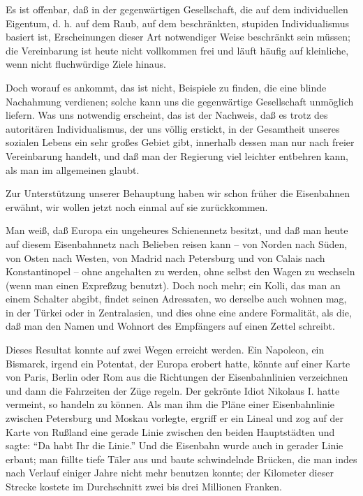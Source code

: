 \documentclass{scrbook}
\begin{document}
Es ist offenbar, daß in der gegenwärtigen Gesellschaft, die auf dem individuellen Eigentum, d. h. auf dem Raub, auf dem beschränkten, stupiden Individualismus basiert ist, Erscheinungen dieser Art notwendiger Weise beschränkt sein müssen; die Vereinbarung ist heute nicht vollkommen frei und läuft häufig auf kleinliche, wenn nicht fluchwürdige Ziele hinaus.

Doch worauf es ankommt, das ist nicht, Beispiele zu finden, die eine blinde Nachahmung verdienen; solche kann uns die gegenwärtige Gesellschaft unmöglich liefern. Was uns notwendig erscheint, das ist der Nachweis, daß es trotz des autoritären Individualismus, der uns völlig erstickt, in der Gesamtheit unseres sozialen Lebens ein sehr großes Gebiet gibt, innerhalb dessen man nur nach freier Vereinbarung handelt, und daß man der Regierung viel leichter entbehren kann, als man im allgemeinen glaubt.

Zur Unterstützung unserer Behauptung haben wir schon früher die Eisenbahnen erwähnt, wir wollen jetzt noch einmal auf sie zurückkommen.

Man weiß, daß Europa ein ungeheures Schienennetz besitzt, und daß man heute auf diesem Eisenbahnnetz nach Belieben reisen kann – von Norden nach Süden, von Osten nach Westen, von Madrid nach Petersburg und von Calais nach Konstantinopel – ohne angehalten zu werden, ohne selbst den Wagen zu wechseln (wenn man einen Expreßzug benutzt). Doch noch mehr; ein Kolli, das man an einem Schalter abgibt, findet seinen Adressaten, wo derselbe auch wohnen mag, in der Türkei oder in Zentralasien, und dies ohne eine andere Formalität, als die, daß man den Namen und Wohnort des Empfängers auf einen Zettel schreibt.

Dieses Resultat konnte auf zwei Wegen erreicht werden. Ein Napoleon, ein Bismarck, irgend ein Potentat, der Europa erobert hatte, könnte auf einer Karte von Paris, Berlin oder Rom aus die Richtungen der Eisenbahnlinien verzeichnen und dann die Fahrzeiten der Züge regeln. Der gekrönte Idiot Nikolaus I. hatte vermeint, so handeln zu können. Als man ihm die Pläne einer Eisenbahnlinie zwischen Petersburg und Moskau vorlegte, ergriff er ein Lineal und zog auf der Karte von Rußland eine gerade Linie zwischen den beiden Hauptstädten und sagte: ``Da habt Ihr die Linie.'' Und die Eisenbahn wurde auch in gerader Linie erbaut; man füllte tiefe Täler aus und baute schwindelnde Brücken, die man indes nach Verlauf einiger Jahre nicht mehr benutzen konnte; der Kilometer dieser Strecke kostete im Durchschnitt zwei bis drei Millionen Franken.
\end{document}
